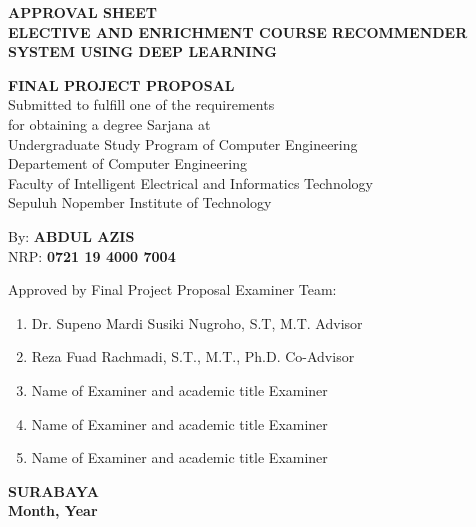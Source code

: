 {
\begin{center}
    \uppercase{\textbf{\large Approval Sheet}} \\

    \vspace*{10mm}
    \uppercase{\textbf{Elective and Enrichment Course Recommender System using Deep Learning}}
    \vspace*{10mm}

    {
        \uppercase{\textbf{Final Project Proposal}} \\
        Submitted to fulfill one of the requirements                  \\
        for obtaining a degree Sarjana at                             \\
        Undergraduate Study Program of Computer Engineering       \\
        Departement of Computer Engineering                            \\
        Faculty of Intelligent Electrical and Informatics Technology  \\
        Sepuluh Nopember Institute of Technology                           \\
    }

    \vspace*{1.5cm}
    By: \textbf{\uppercase{Abdul Azis}}                                       \\
    NRP: \textbf{0721 19 4000 7004}                               \\
    \vspace*{1.5cm}

    Approved by Final Project Proposal Examiner Team:             \\
    \vspace*{5mm}

    \begin{enumerate}
        \setlength\itemsep{1.5em}
        \item Dr. Supeno Mardi Susiki Nugroho, S.T, M.T. \hfill Advisor
        \item Reza Fuad Rachmadi, S.T., M.T., Ph.D. \hfill Co-Advisor
        \item Name of Examiner and academic title \hfill Examiner
        \item Name of Examiner and academic title \hfill Examiner
        \item Name of Examiner and academic title \hfill Examiner
    \end{enumerate}

    \vspace*{1.5cm}
    \uppercase{\textbf{surabaya}}                      \\
    \textbf{Month, Year}                               \\

\end{center}
}